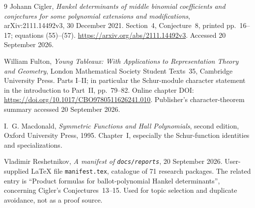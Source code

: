 \documentclass[11pt,a4paper]{article}
\theoremstyle{definition}
\theoremstyle{remark}
\numberwithin{equation}{section}
\begin{document}
\begin{thebibliography}{9}
Johann Cigler,
\emph{Hankel determinants of middle binomial coefficients and conjectures for
some polynomial extensions and modifications},
arXiv:2111.14492v3, 30 December 2021.
Section~4, Conjecture~8, printed pp.~16--17; equations (55)--(57).
\url{https://arxiv.org/abs/2111.14492v3}.
Accessed 20 September 2026.

William Fulton,
\emph{Young Tableaux: With Applications to Representation Theory and Geometry},
London Mathematical Society Student Texts~35, Cambridge University Press.
Parts I--II; in particular the Schur-module character statement in the
introduction to Part~II, pp.~79--82.
Online chapter DOI:
\url{https://doi.org/10.1017/CBO9780511626241.010}.
Publisher's character-theorem summary accessed 20 September 2026.

I.~G. Macdonald,
\emph{Symmetric Functions and Hall Polynomials}, second edition,
Oxford University Press, 1995.
Chapter~I, especially the Schur-function identities and specializations.

Vladimir Reshetnikov,
\emph{A manifest of \texttt{docs/reports}}, 20 September 2026.
User-supplied \LaTeX{} file \texttt{manifest.tex}, catalogue of 71 research
packages. The related entry is
``Product formulas for ballot-polynomial Hankel determinants'', concerning
Cigler's Conjectures~13--15. Used for topic selection and duplicate avoidance,
not as a proof source.
\end{thebibliography}
\end{document}
